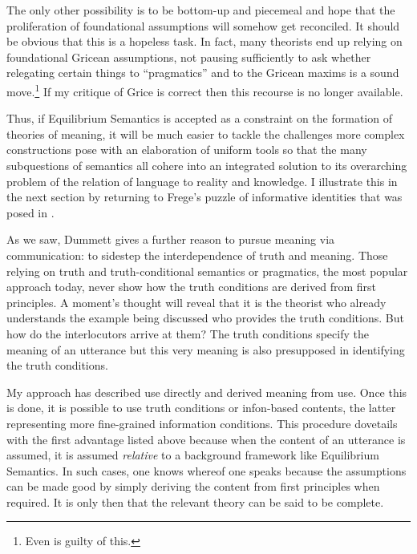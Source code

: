 The only other possibility is to be bottom-up and piecemeal and hope that the proliferation of foundational assumptions will somehow get reconciled. It should be obvious that this is a hopeless task. In fact, many theorists end up relying on foundational Gricean assumptions, not pausing sufficiently to ask whether relegating certain things to ``pragmatics'' and to the Gricean maxims is a sound move.\footnote{Even \citet{kripke:srsr} is guilty of this.} If my critique of Grice is correct then this recourse is no longer available.



Thus, if Equilibrium Semantics is accepted as a constraint on the formation of theories of meaning, it will be much easier to tackle the challenges more complex constructions pose with an elaboration of uniform tools so that the many subquestions of semantics all cohere into an integrated solution to its overarching problem of the relation of language to reality and knowledge. I illustrate this in the next section by returning to Frege's puzzle of informative identities that was posed in .

As we saw, Dummett gives a further reason to pursue meaning via communication: to sidestep the interdependence of truth and meaning. Those relying on truth and truth-conditional semantics or pragmatics, the most popular approach today, never show how the truth conditions are derived from first principles. A moment's thought will reveal that it is the theorist who already understands the example being discussed who provides the truth conditions. But how do the interlocutors arrive at them? The truth conditions specify the meaning of an utterance but this very meaning is also presupposed in identifying the truth conditions. 

My approach has described use directly and derived meaning from use. Once this is done, it is possible to use truth conditions or infon-based contents, the latter representing more fine-grained information conditions. This procedure dovetails with the first advantage listed above because when the content of an utterance is assumed, it is assumed \emph{relative} to a background framework like Equilibrium Semantics. In such cases, one knows whereof one speaks because the assumptions can be made good by simply deriving the content from first principles when required. It is only then that the relevant theory can be said to be complete.

